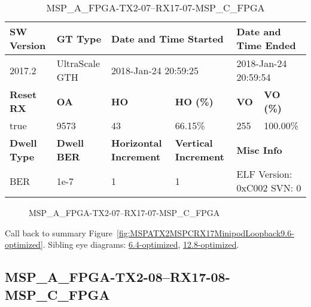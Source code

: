 \begin{table}[h]
\centering
\caption{MSP\_A\_FPGA-TX2-07--RX17-07-MSP\_C\_FPGA}
\label{tab:MSPAFPGATX207RX1707MSPCFPGA9.6-optimized}
\begin{tabular}{@{}|l|l|l|l|l|l|@{}}
\toprule
\textbf{SW Version}                & \textbf{GT Type}   & \multicolumn{2}{l|}{\textbf{Date and Time Started}}            & \multicolumn{2}{l|}{\textbf{Date and Time Ended}}        \\ \midrule
2017.2                       & UltraScale GTH          & \multicolumn{2}{l|}{2018-Jan-24 20:59:25}                   & \multicolumn{2}{l|}{2018-Jan-24 20:59:54}               \\ \midrule
\textbf{Reset RX}                  & \textbf{OA} & \textbf{HO}   & \textbf{HO (\%)} & \textbf{VO} & \textbf{VO (\%)} \\ \midrule
true & 9573        & 43          & 66.15\%        & 255        & 100.00\%       \\ \midrule
\textbf{Dwell Type}                & \textbf{Dwell BER} & \textbf{Horizontal Increment} & \textbf{Vertical Increment}    & \multicolumn{2}{l|}{\textbf{Misc Info}}                  \\ \midrule
BER                            & 1e-7        & 1        & 1           & \multicolumn{2}{l|}{ELF Version: 0xC002 SVN: 0}                         \\ \bottomrule
\end{tabular}
\end{table}

\begin{figure}[h]
\caption{MSP\_A\_FPGA-TX2-07--RX17-07-MSP\_C\_FPGA} \label{fig:MSPAFPGATX207RX1707MSPCFPGA9.6-optimized}
\end{figure}

Call back to summary Figure~\ref{fig:MSPATX2MSPCRX17MinipodLoopback9.6-optimized}.
Sibling eye diagrams: \hyperref[sec:MSPAFPGATX207RX1707MSPCFPGA6.4-optimized]{6.4-optimized}, \hyperref[sec:MSPAFPGATX207RX1707MSPCFPGA12.8-optimized]{12.8-optimized}.

\clearpage
\newpage


\subsection{MSP\_A\_FPGA-TX2-08--RX17-08-MSP\_C\_FPGA}\label{sec:MSPAFPGATX208RX1708MSPCFPGA9.6-optimized}

